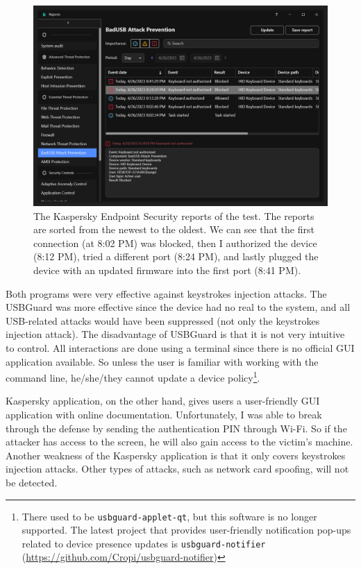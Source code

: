 \begin{figure}[ht]
    \centering
    \includegraphics[width=0.9\linewidth]{./obrazky-figures/kaspersky_report.PNG}
    \caption{The Kaspersky Endpoint Security reports of the test. The reports are sorted from the newest to the oldest. We can see that the first connection (at 8:02 PM) was blocked, then I authorized the device (8:12 PM), tried a different port (8:24 PM), and lastly plugged the device with an updated firmware into the first port (8:41 PM).}
    \label{fig:kaspersky_report}
\end{figure}

Both programs were very effective against keystrokes injection attacks. The USBGuard was more effective since the device had no real to the system, and all USB-related attacks would have been suppressed (not only the keystrokes injection attack). The disadvantage of USBGuard is that it is not very intuitive to control. All interactions are done using a terminal since there is no official GUI application available. So unless the user is familiar with working with the command line, he/she/they cannot update a device policy\footnote{There used to be \texttt{usbguard-applet-qt}, but this software is no longer supported. The latest project that provides user-friendly notification pop-ups related to device presence updates is \texttt{usbguard-notifier} (\url{https://github.com/Cropi/usbguard-notifier})}.

Kaspersky application, on the other hand, gives users a user-friendly GUI application with online documentation. Unfortunately, I was able to break through the defense by sending the authentication PIN through Wi-Fi. So if the attacker has access to the screen, he will also gain access to the victim's machine. Another weakness of the Kaspersky application is that it only covers keystrokes injection attacks. Other types of attacks, such as network card spoofing, will not be detected.

